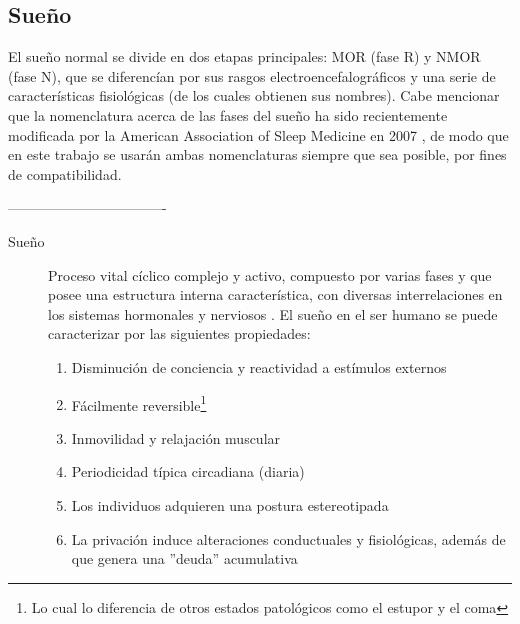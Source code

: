 \documentclass[12pt,a4paper]{mitthesis}
\begin{document}
\subsection{Sue\~no}

El sue\~no normal se divide en dos etapas principales: MOR (fase R) y NMOR (fase N), que se 
diferenc\'ian por sus rasgos electroencefalogr\'aficos y una serie de caracter\'isticas 
fisiol\'ogicas (de los cuales obtienen sus nombres).
Cabe mencionar que la nomenclatura acerca de las fases del sue\~no ha sido recientemente modificada 
por la American Association of Sleep Medicine en 2007 \cite{AASM07}, de modo que en este trabajo 
se usar\'an ambas nomenclaturas siempre que sea posible, por fines de compatibilidad.


----------------------------------

\begin{description}
\item[Sue\~no] Proceso vital c\'iclico complejo y activo, compuesto por varias fases y que posee 
una estructura interna caracter\'istica, con diversas interrelaciones en los sistemas hormonales y 
nerviosos \cite{FernandezConde07}.
El sue\~no en el ser humano se puede caracterizar por las siguientes propiedades\cite{CarrilloMora}:
\begin{enumerate}
\item Disminuci\'on de conciencia y reactividad a est\'imulos externos
\item F\'acilmente reversible\footnote{Lo cual lo diferencia de otros estados 
patol\'ogicos como el estupor y el coma}
\item Inmovilidad y relajaci\'on muscular
\item Periodicidad t\'ipica circadiana (diaria)
\item Los individuos adquieren una postura estereotipada
\item La privaci\'on induce alteraciones conductuales y 
fisiol\'ogicas, adem\'as de que genera una ''deuda'' acumulativa
\end{enumerate}
\end{description}
\end{document}
